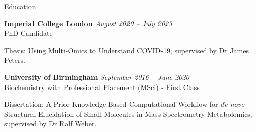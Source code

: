 \documentclass{resume}
\begin{document}

\begin{rSection}{Education}

\vspace{1pt plus 1pt}
{\bf Imperial College London} \hfill {\em August 2020 -- July 2023} 
\\ PhD Candidate
\item Thesis: Using Multi-Omics to Understand COVID-19, supervised by Dr James Peters.


{\bf University of Birmingham} \hfill {\em September 2016 -- June 2020} 
\\ Biochemistry with Professional Placement (MSci) - First Class
\item Dissertation: A Prior Knowledge-Based Computational Workflow for \textit{de novo} Structural Elucidation of Small Molecules in Mass Spectrometry Metabolomics, supervised by Dr Ralf Weber.

\end{rSection}
\end{document}
